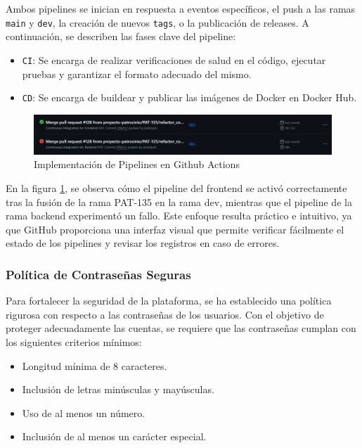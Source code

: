 Ambos pipelines se inician en respuesta a eventos específicos, el push a las ramas \texttt{main} y \texttt{dev}, la creación de nuevos \texttt{tags}, o la publicación de releases. A continuación, se describen las fases clave del pipeline:

\begin{itemize}
    \item \texttt{CI}: Se encarga de realizar verificaciones de salud en el código, ejecutar pruebas y garantizar el formato adecuado del mismo.
    \item \texttt{CD}: Se encarga de buildear y publicar las imágenes de Docker en Docker Hub.
\end{itemize}

\begin{figure}[H]
\centering
\includegraphics[width=1\linewidth]{fig/workflows.png}
\caption{Implementación de Pipelines en Github Actions}
\label{fig:workflows-implementacion}
\end{figure}

En la figura \ref{fig:workflows-implementacion}, se observa cómo el pipeline del frontend se activó correctamente tras la fusión de la rama PAT-135 en la rama dev, mientras que el pipeline de la rama backend experimentó un fallo. Este enfoque resulta práctico e intuitivo, ya que GitHub proporciona una interfaz visual que permite verificar fácilmente el estado de los pipelines y revisar los registros en caso de errores.

\subsubsection{Política de Contraseñas Seguras}

Para fortalecer la seguridad de la plataforma, se ha establecido una política rigurosa con respecto a las contraseñas de los usuarios. Con el objetivo de proteger adecuadamente las cuentas, se requiere que las contraseñas cumplan con los siguientes criterios mínimos:

\begin{itemize}
    \item Longitud mínima de 8 caracteres.
    \item Inclusión de letras minúsculas y mayúsculas.
    \item Uso de al menos un número.
    \item Inclusión de al menos un carácter especial.
\end{itemize}

